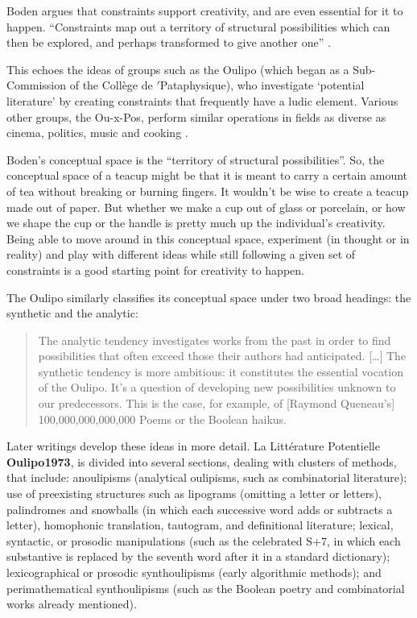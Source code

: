 
Boden argues that constraints support creativity, and are even essential for it to happen. ``Constraints map out a territory of structural possibilities which can then be explored, and perhaps transformed to give another one'' \autocite[p.82]{Boden2003}.

This echoes the ideas of groups such as the Oulipo (which began as a Sub-Commission of the Collège de $'$Pataphysique), who investigate `potential literature' by creating constraints that frequently have a ludic element. Various other groups, the Ou-x-Pos, perform similar operations in fields as diverse as cinema, politics, music and cooking \autocite{Motte2007}.

Boden's conceptual space is the ``territory of structural possibilities''. So, the conceptual space of a teacup might be that it is meant to carry a certain amount of tea without breaking or burning fingers. It wouldn't be wise to create a teacup made out of paper. But whether we make a cup out of glass or porcelain, or how we shape the cup or the handle is pretty much up the individual's creativity. Being able to move around in this conceptual space, experiment (in thought or in reality) and play with different ideas while still following a given set of constraints is a good starting point for creativity to happen.

The Oulipo similarly classifies its conceptual space under two broad headings: the synthetic and the analytic:

\begin{quote}
  The analytic tendency investigates works from the past in order to find possibilities that often exceed those their authors had anticipated. […] The synthetic tendency is more ambitious: it constitutes the essential vocation of the Oulipo. It's a question of developing new possibilities unknown to our predecessors. This is the case, for example, of [Raymond Queneau's] 100,000,000,000,000 Poems or the Boolean haikus. \autocite[p.27]{Motte2007}
\end{quote}

Later writings develop these ideas in more detail. La Littérature Potentielle \textbf{Oulipo1973}, is divided into several sections, dealing with clusters of methods, that include: anoulipisms (analytical oulipisms, such as combinatorial literature); use of preexisting structures such as lipograms (omitting a letter or letters), palindromes and snowballs (in which each successive word adds or subtracts a letter), homophonic translation, tautogram, and definitional literature; lexical, syntactic, or prosodic manipulations (such as the celebrated S+7, in which each substantive is replaced by the seventh word after it in a standard dictionary); lexicographical or prosodic synthoulipisms (early algorithmic methods); and perimathematical synthoulipisms (such as the Boolean poetry and combinatorial works already mentioned).

